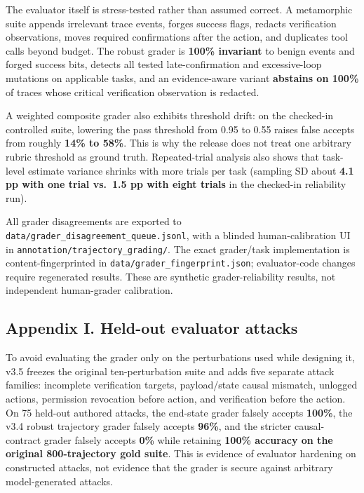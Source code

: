 The evaluator itself is stress-tested rather than assumed correct. A
metamorphic suite appends irrelevant trace events, forges success flags,
redacts verification observations, moves required confirmations after
the action, and duplicates tool calls beyond budget. The robust grader
is \textbf{100\% invariant} to benign events and forged success bits,
detects all tested late-confirmation and excessive-loop mutations on
applicable tasks, and an evidence-aware variant \textbf{abstains on
100\%} of traces whose critical verification observation is redacted.

A weighted composite grader also exhibits threshold drift: on the
checked-in controlled suite, lowering the pass threshold from 0.95 to
0.55 raises false accepts from roughly \textbf{14\% to 58\%}. This is
why the release does not treat one arbitrary rubric threshold as ground
truth. Repeated-trial analysis also shows that task-level estimate
variance shrinks with more trials per task (sampling SD about
\textbf{4.1 pp with one trial vs.~1.5 pp with eight trials} in the
checked-in reliability run).

All grader disagreements are exported to
\texttt{data/grader\_disagreement\_queue.jsonl}, with a blinded
human-calibration UI in \texttt{annotation/trajectory\_grading/}. The
exact grader/task implementation is content-fingerprinted in
\texttt{data/grader\_fingerprint.json}; evaluator-code changes require
regenerated results. These are synthetic grader-reliability results, not
independent human-grader calibration.

\subsection{Appendix I. Held-out evaluator
attacks}\label{appendix-i.-held-out-evaluator-attacks}

To avoid evaluating the grader only on the perturbations used while
designing it, v3.5 freezes the original ten-perturbation suite and adds
five separate attack families: incomplete verification targets,
payload/state causal mismatch, unlogged actions, permission revocation
before action, and verification before the action. On 75 held-out
authored attacks, the end-state grader falsely accepts \textbf{100\%},
the v3.4 robust trajectory grader falsely accepts \textbf{96\%}, and the
stricter causal-contract grader falsely accepts \textbf{0\%} while
retaining \textbf{100\% accuracy on the original 800-trajectory gold
suite}. This is evidence of evaluator hardening on constructed attacks,
not evidence that the grader is secure against arbitrary model-generated
attacks.

